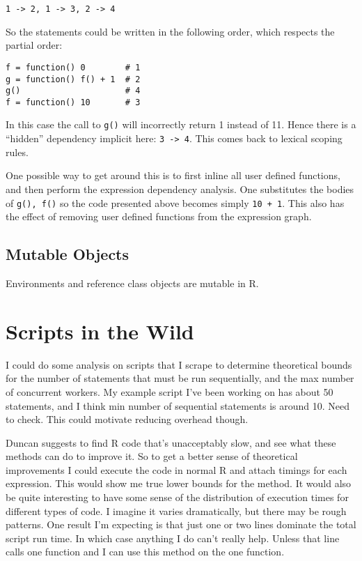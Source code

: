 \documentclass[12pt]{article}
\begin{document}
\begin{verbatim}
1 -> 2, 1 -> 3, 2 -> 4
\end{verbatim}

So the statements could be written in the following order, which respects
the partial order:

\begin{verbatim}
f = function() 0        # 1
g = function() f() + 1  # 2
g()                     # 4
f = function() 10       # 3
\end{verbatim}

In this case the call to \texttt{g()} will incorrectly return 1 instead of 11.
Hence there is a ``hidden'' dependency implicit here: \texttt{3 -> 4}.
This comes back to lexical scoping rules.

One possible way to get around this is to first inline all user defined
functions, and then perform the expression dependency analysis. One
substitutes the bodies of \texttt{g(), f()} so the code presented above
becomes simply \texttt{10 + 1}. This also has the effect of removing user
defined functions from the expression graph.

\subsection{Mutable Objects}

Environments and reference class objects are mutable in R. 

\section{Scripts in the Wild}

I could do some analysis on scripts that I scrape to determine theoretical
bounds for the number of statements that must be run sequentially,
and the max number of concurrent workers. My example script I've been
working on has about 50 statements, and I think min number of sequential
statements is around 10. Need to check. This could motivate reducing
overhead though.

Duncan suggests to find R code that's unacceptably slow, and see what these
methods can do to improve it. So to get a better sense of theoretical
improvements I could execute the code in normal R and attach timings for
each expression. This would show me true lower bounds for the method. It
would also be quite interesting to have some sense of the distribution of
execution times for different types of code. I imagine it varies
dramatically, but there may be rough patterns. One result I'm expecting is
that just one or two lines dominate the total script run time. In which
case anything I do can't really help. Unless that line calls one function
and I can use this method on the one function.
\end{document}
